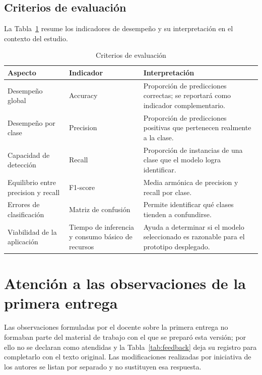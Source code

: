 \documentclass[conference]{IEEEtran}
\begin{document}
\subsection{Criterios de evaluación}

La Tabla~\ref{tab:criterios} resume los indicadores de desempeño y su interpretación en el contexto del estudio.

\begin{table}[!t]
\centering
\caption{Criterios de evaluación}
\label{tab:criterios}
\begin{tabular}{p{3.4cm}p{3.2cm}p{8.6cm}}
\toprule
\textbf{Aspecto} & \textbf{Indicador} & \textbf{Interpretación} \\
\midrule
Desempeño global & Accuracy & Proporción de predicciones correctas; se reportará como indicador complementario. \\
Desempeño por clase & Precision & Proporción de predicciones positivas que pertenecen realmente a la clase. \\
Capacidad de detección & Recall & Proporción de instancias de una clase que el modelo logra identificar. \\
Equilibrio entre precision y recall & F1-score & Media armónica de precision y recall por clase. \\
Errores de clasificación & Matriz de confusión & Permite identificar qué clases tienden a confundirse. \\
Viabilidad de la aplicación & Tiempo de inferencia y consumo básico de recursos & Ayuda a determinar si el modelo seleccionado es razonable para el prototipo desplegado. \\
\bottomrule
\end{tabular}
\end{table}

\section{Atención a las observaciones de la primera entrega}

Las observaciones formuladas por el docente sobre la primera entrega no formaban parte del material de trabajo con el que se preparó esta versión; por ello no se declaran como atendidas y la Tabla~\ref{tab:feedback} deja su registro para completarlo con el texto original. Las modificaciones realizadas por iniciativa de los autores se listan por separado y no sustituyen esa respuesta.
\end{document}
